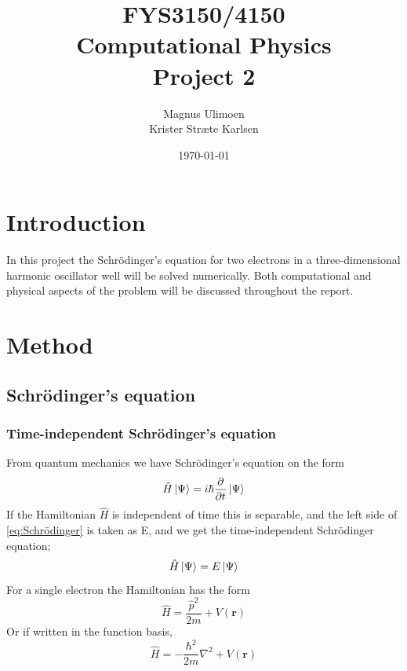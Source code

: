 \documentclass[11pt,a4paper,english,draft]{article}
\title{FYS3150/4150\\Computational Physics\\Project 2}
\author{Magnus Ulimoen\\Krister Stræte Karlsen}
\date{\today}
\numberwithin{equation}{section}
\newcommand{\ve}[1]{\mathbf{#1}} %
\let\oldhat\hat
\renewcommand{\hat}[1]{\oldhat{#1}}
\begin{document}
\maketitle

\section{Introduction}

In this project the Schrödinger's equation for two electrons in a
three-dimensional harmonic oscillator well will be solved numerically. 
Both computational and physical aspects of the problem will be discussed 
throughout the report. 


\section{Method}

\subsection{Schrödinger's equation}


\subsubsection{Time-independent Schrödinger's equation}
From quantum mechanics we have Schrödinger's equation on the form
\begin{equation}
\hat{H} \ket{\Psi} = i\hbar \frac{\partial }{\partial t} \ket{\Psi}
\label{eq:Schrödinger}
\end{equation}
If the Hamiltonian $\hat{H}$ is independent of time this is separable,
and the left side of \eqref{eq:Schrödinger} is taken as E, and we get the
time-independent Schrödinger equation;
\begin{equation}
 \hat{H}\ket{\Psi} = E\ket{\Psi}
\end{equation}
For a single electron the Hamiltonian has the form 
\begin{equation}
\hat{H} = \frac{\hat{p}^2}{2m} + V(\ve{r})
\end{equation}
Or if written in the function basis,
\begin{equation}
\hat{H} = -\frac{\hbar^2}{2m}\nabla^2 + V(\ve{r})
\label{eq:Hamiltonian}
\end{equation}
\end{document}
